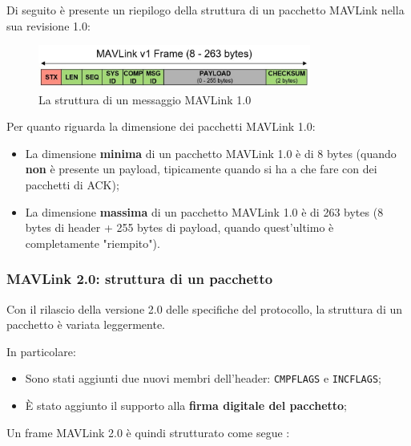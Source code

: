 \documentclass[a4paper, 12pt, oneside]{article}
\theoremstyle{definition}
\begin{document}
Di seguito è presente un riepilogo della struttura di un pacchetto MAVLink nella sua revisione 1.0:

\begin{figure}[H]
    \centering
    \includegraphics[width=0.8\textwidth]{images/packet_mavlink_v1.jpg}
    \caption{La struttura di un messaggio MAVLink 1.0}
\end{figure}

Per quanto riguarda la dimensione dei pacchetti MAVLink 1.0:

\begin{itemize}
    \item La dimensione \textbf{minima} di un pacchetto MAVLink 1.0 è di 8 bytes (quando \textbf{non} è presente un payload, tipicamente quando si ha a che fare con dei pacchetti di ACK);
    \item La dimensione \textbf{massima} di un pacchetto MAVLink 1.0 è di 263 bytes (8 bytes di header + 255 bytes di payload, quando quest'ultimo è completamente "riempito").
\end{itemize}

\newpage

\subsubsection{MAVLink 2.0: struttura di un pacchetto}

Con il rilascio della versione 2.0 delle specifiche del protocollo, la struttura di un pacchetto è variata leggermente.

In particolare:

\begin{itemize}
    \item Sono stati aggiunti due nuovi membri dell'header: \texttt{CMPFLAGS} e \texttt{INCFLAGS};
    \item È stato aggiunto il supporto alla \textbf{firma digitale del pacchetto};\\
\end{itemize}
Un frame MAVLink 2.0 è quindi strutturato come segue \cite{mavlink-2-packet}:
\end{document}
